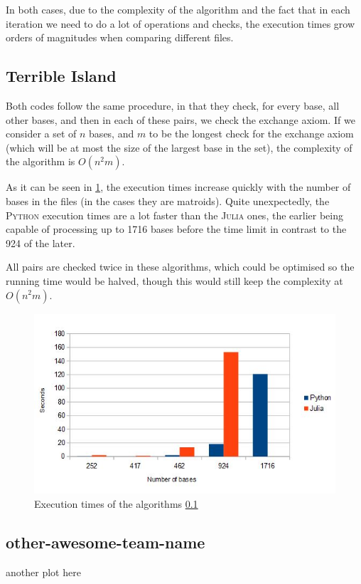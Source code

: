 \documentclass[11pt]{amsart}
\begin{document}
In both cases,
due to the complexity of the algorithm
and the fact that in each iteration we need to do a lot of operations and checks,
the execution times grow orders of magnitudes when comparing different files.

\subsection{Terrible Island}
\label{terribleisland}

Both codes follow the same procedure, in that they check, for every base, all other bases, and then in each of these pairs, we check the exchange axiom. If we consider a set of $n$ bases, and $m$ to be the longest check for the exchange axiom (which will be at most the size of the largest base in the set), the complexity of the algorithm is $O(n^{2}m)$.

As it can be seen in \ref{figureterribleisland}, the execution times increase quickly with the number of bases in the files (in the cases they are matroids). Quite unexpectedly, the \textsc{Python} execution times are a lot faster than the \textsc{Julia} ones, the earlier being capable of processing up to 1716 bases before the time limit in contrast to the 924 of the later.

All pairs are checked twice in these algorithms, which could be optimised so the running time would be halved, though this would still keep the complexity at $O(n^{2}m)$.

\begin{figure}[h!]
    \centering
    \includegraphics[width=.7\textwidth]{./Terrible-Island/times.jpeg}
    \caption{Execution times of the algorithms \ref{terribleisland}}
    \label{figureterribleisland}
\end{figure}

\subsection{other-awesome-team-name}

another plot here
\end{document}

